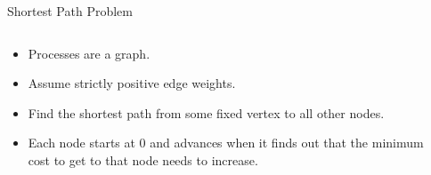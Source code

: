 \documentclass{beamer}
\begin{document}
\begin{frame}{Shortest Path Problem}
\begin{columns}[T]
\begin{column}{0.48\linewidth}
    \begin{itemize}
        \item Processes are a graph.
        \item Assume strictly positive edge weights.
        \item Find the shortest path from some fixed vertex to all other nodes.
        \vskip12pt
        \item Each node starts at 0 and advances when it finds out that the
        minimum cost to get to that node needs to increase.
    \end{itemize}
    \end{column}
    \begin{column}{0.48\linewidth}
    \end{column}
    \end{columns}
\end{frame}
\end{document}
